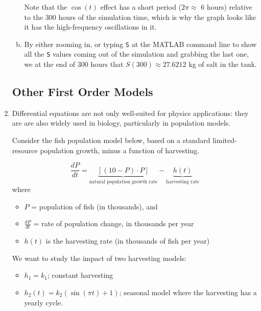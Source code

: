 \begin{enumerate}[1.]
\begin{Solution}
\begin{enumerate}[(a)]
  Note that the $\cos(t)$ effect has a short period ($2 \pi \approx $ 6 hours)
  relative to the 300 hours of the simulation time, which is why the
  graph looks like it has the high-frequency oscillations in it.

\item By either zooming in, or typing \verb#S# at the MATLAB command
  line to show all the \verb#S# values coming out of the simulation
  and grabbing the last one, we at the end of 300 hours that
  $S(300) \approx 27.6212$ kg of salt in the tank.

  \end{enumerate}
  
\end{Solution}

\subsection*{Other First Order Models}
\item 
  \begin{Question}
    
Differential equations are not only well-suited for physics
  applications: they are are also widely used in biology, particularly
  in population models.

  Consider the fish population model below, based on a standard
  limited-resource population growth, minus a function of harvesting.

$$\frac{dP}{dt} =\underbrace{ [(10 -P)\cdot P]}_{\mbox{natural population growth rate}} -\underbrace{h(t)}_{\mbox{harvesting rate}}$$
where
\begin{itemize}
\item $P$  = population of fish (in thousands), and 
\item $\frac{dP}{dt}$  = rate of population change, in thousands per 
year
\item $h(t)$ is the harvesting rate (in thousands of fish per 
year)
\end{itemize}

We want to study the impact of two harvesting models:
\begin{itemize}
\item $h_1 = k_1$; constant harvesting
\item $h_2(t) = k_2 (\sin(\pi t) + 1)$; seasonal model where the
  harvesting has a yearly cycle.
\end{itemize}
\begin{enumerate}[(a)]


\end{enumerate}
\end{Question}
\end{enumerate}
